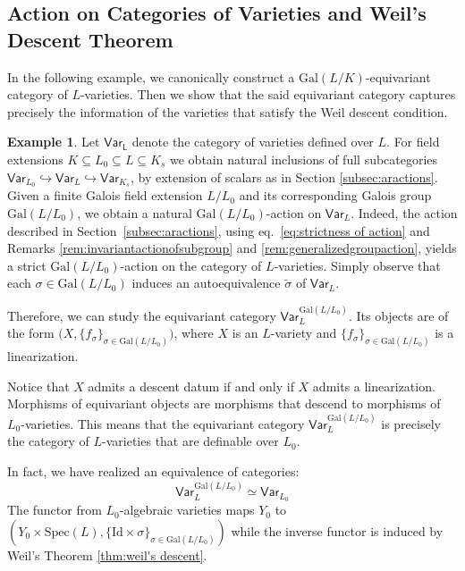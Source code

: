 \documentclass[10pt]{amsart}
\theoremstyle{definition}
\newtheorem{example}[theorem]{Example}
\newcommand{\Spe}{ {\mathrm{Spec} } }
\newcommand{\Gal}{{ \mathrm{Gal}}}
\begin{document}
\subsection{Action on Categories of Varieties and Weil's Descent Theorem}\label{sec:ActionOnCatArith}
In the following example, we canonically construct a $\Gal(L/K)$-equivariant category of $L$-varieties. Then we show that the said equivariant category captures precisely the information of the varieties that satisfy the Weil descent condition.

\begin{example}\label{Galoisactiononcategoryofvarieties}
Let $\mathsf{Var_{L}}$ denote the category of varieties defined over $L$. For field extensions $K \subseteq L_0 \subseteq L \subseteq K_s$ we obtain natural inclusions of full subcategories $\mathsf{Var}_{L_0} \hookrightarrow \mathsf{Var}_L \hookrightarrow \mathsf{Var}_{K_s}$, by extension of scalars as in Section \ref{subsec:aractions}. 
Given a finite Galois field extension $L/L_0$ and its corresponding Galois group $\Gal(L/L_0)$, we obtain a natural $\Gal(L/L_0)$-action on $\mathsf{Var}_L$. Indeed, the action described in Section~\ref{subsec:aractions}, using eq.~\ref{eq:strictness of action} and Remarks \ref{rem:invariantactionofsubgroup} and \ref{rem:generalizedgroupaction}, yields a strict $\Gal(L/L_0)$-action on the category of $L$-varieties. Simply observe that each $\sigma \in \Gal(L/L_0)$ induces an autoequivalence $\widetilde{\sigma}$ of $\mathsf{Var}_L$.

Therefore, we can study the equivariant category $\mathsf{Var}_L^{\Gal(L/L_0)}$. Its objects are of the form 
$\big(X, \{f_\sigma\}_{\sigma \in \Gal(L/L_0)} \big)$, where $X$ is an $L$-variety and $\{f_{\sigma}\}_{\sigma \in \Gal(L/L_0)}$ is a linearization. 

Notice that $X$ admits a descent datum if and only if $X$ admits a linearization. Morphisms of equivariant objects are morphisms that descend to morphisms of $L_0$-varieties.
This means that the equivariant category $\mathsf{Var}_L^{\Gal(L/L_0)}$ is precisely the category of $L$-varieties that are definable over $L_0$.

In fact, we have realized an equivalence of categories:
\[
\mathsf{Var}_L^{\Gal(L/L_0)} \simeq \mathsf{Var}_{L_0}
\]
The functor from $L_0$-algebraic varieties maps $Y_0$ to $(Y_0\times \Spe(L) , \{\mathrm{Id}\times \sigma \}_{\sigma \in \Gal (L/L_0)})$ while the inverse functor is induced by Weil's Theorem \ref{thm:weil's descent}.
\end{example}
\end{document}
